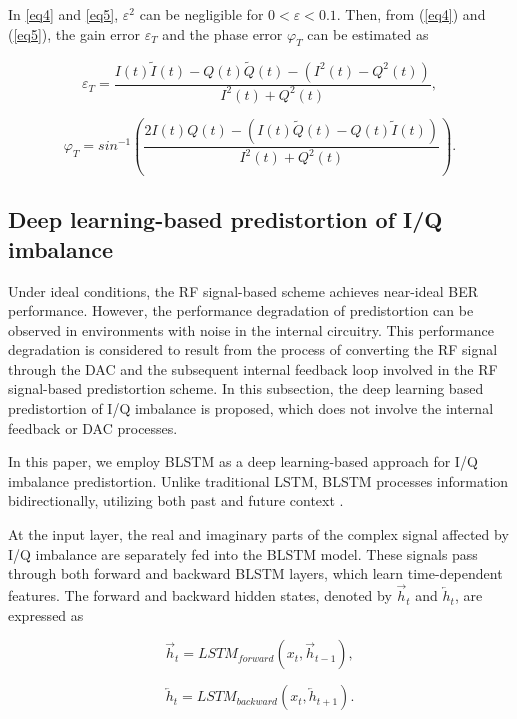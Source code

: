 \documentclass[lettersize,journal]{IEEEtran}
\begin{document}
In \eqref{eq4} and \eqref{eq5}, $\varepsilon^2$ can be negligible for $0<\varepsilon < 0.1$.
Then, from (\ref{eq4}) and (\ref{eq5}), the gain error $\varepsilon_T$ and the phase error $\varphi_T$ can be estimated as

\begin{equation}
\label{eq6}
\varepsilon_T =
\frac{I(t) \tilde I(t) - Q(t) \tilde Q(t) - (I^2(t) - Q^2(t))}{I^2(t) + Q^2(t)},
\end{equation}

\begin{equation}
\label{eq7}
\varphi_T =
sin^{-1} \left( \frac{2I(t)Q(t) - (I(t) \tilde Q(t) - Q(t) \tilde I(t))}{I^2(t) + Q^2(t)} \right).
\end{equation}

\subsection{Deep learning-based predistortion of I/Q imbalance}

Under ideal conditions, the RF signal-based scheme achieves near-ideal BER performance.
However, the performance degradation of predistortion can be observed in environments with noise in the internal circuitry.
This performance degradation is considered to result from the process of converting the RF signal through the DAC and the subsequent internal feedback loop involved in the RF signal-based predistortion scheme.
In this subsection, the deep learning based predistortion of I/Q imbalance is proposed, which does not involve the internal feedback or DAC processes.

In this paper, we employ BLSTM as a deep learning-based approach for I/Q imbalance predistortion. Unlike traditional LSTM, BLSTM processes information bidirectionally, utilizing both past and future context \cite{REF10, REF11, REF12}.

At the input layer, the real and imaginary parts of the complex signal affected by I/Q imbalance are separately fed into the BLSTM model.
These signals pass through both forward and backward BLSTM layers, which learn time-dependent features.
The forward and backward hidden states, denoted by $\overrightarrow{h}_t$ and $\overleftarrow{h}_t$, are expressed as

\begin{equation}
\label{eq8}
\overrightarrow{h}_t = LSTM_{forward}(x_t,\overrightarrow{h}_{t-1}),
\end{equation}

\begin{equation}
\label{eq9}
\overleftarrow{h}_t = LSTM_{backward}(x_t,\overleftarrow{h}_{t+1}).
\end{equation}
\end{document}
